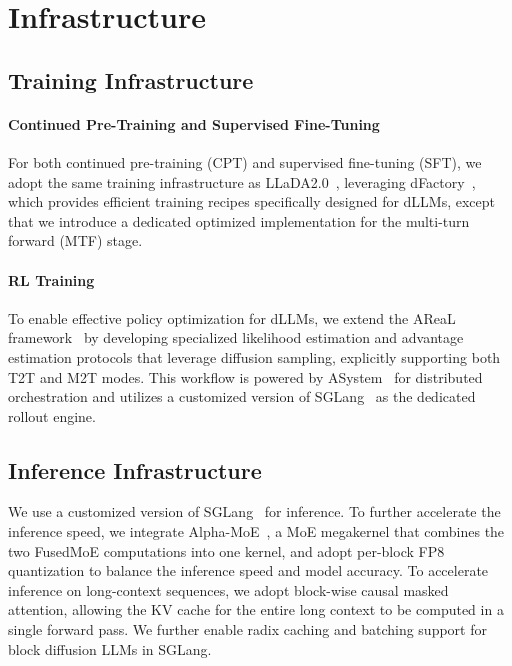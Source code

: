 \section{Infrastructure}
\subsection{Training Infrastructure}

\paragraph{Continued Pre-Training and Supervised Fine-Tuning}
For both continued pre-training (CPT) and supervised fine-tuning (SFT), we adopt the same training infrastructure as LLaDA2.0~\citep{bie_llada20_2025}, leveraging dFactory~\citep{dfactory}, which provides efficient training recipes specifically designed for dLLMs, except that we introduce a dedicated optimized implementation for the multi-turn forward (MTF) stage. 

\paragraph{RL Training}
To enable effective policy optimization for dLLMs, we extend the AReaL framework~\citep{fu2025areal, mei2025real} by developing specialized likelihood estimation and advantage estimation protocols that leverage diffusion sampling, explicitly supporting both T2T and M2T modes. This workflow is powered by ASystem~\citep{lingteam2025stepevolvesscalingreinforcement} for distributed orchestration and utilizes a customized version of SGLang~\citep{antgroupdeepxputeamPowerDiffusionLLMs} as the dedicated rollout engine.

\subsection{Inference Infrastructure}
We use a customized version of SGLang~\citep{antgroupdeepxputeamPowerDiffusionLLMs} for inference. To further accelerate the inference speed, we integrate Alpha-MoE~\citep{alphamoe}, a MoE megakernel that combines the two FusedMoE computations into one kernel, and adopt per-block FP8 quantization to balance the inference speed and model accuracy. To accelerate inference on long-context sequences, we adopt block-wise causal masked attention, allowing the KV cache for the entire long context to be computed in a single forward pass. We further enable radix caching and batching support for block diffusion LLMs in SGLang.

